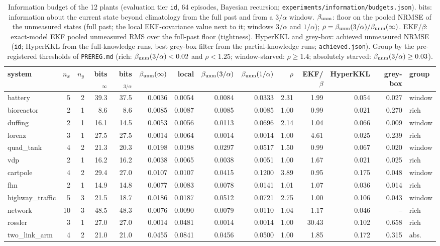 \begin{table}[ht]\centering\scriptsize
\caption{Information budget of the 12 plants (evaluation tier \texttt{id}, 64 episodes, Bayesian recursion;
\texttt{experiments/information/budgets.json}). bits: information about the current state beyond climatology
from the full past and from a $3/\alpha$ window. $\beta_{\rm unm}$: floor on the pooled NRMSE of the
unmeasured states (full past; the local EKF-covariance value next to it; windows $3/\alpha$ and $1/\alpha$);
$\rho=\beta_{\rm unm}(3/\alpha)/\beta_{\rm unm}(\infty)$. EKF/$\beta$: exact-model EKF pooled unmeasured RMS over the
full-past floor (tightness). HyperKKL and grey-box: achieved unmeasured NRMSE (\texttt{id}; HyperKKL from the
full-knowledge runs, best grey-box filter from the partial-knowledge runs; \texttt{achieved.json}). Group by the
pre-registered thresholds of \texttt{PREREG.md} (rich: $\beta_{\rm unm}(3/\alpha)<0.02$ and $\rho<1.25$; window-starved:
$\rho\ge1.4$; absolutely starved: $\beta_{\rm unm}(3/\alpha)\ge0.03$).}\label{tab:m4-budgets}
\setlength{\tabcolsep}{2.2pt}
\begin{tabular}{@{}lrrrrrrrrrrrrl@{}}\hline
system & $n_x$ & $n_y$ & bits$_\infty$ & bits$_{3/\alpha}$ & $\beta_{\rm unm}(\infty)$ & local & $\beta_{\rm unm}(3/\alpha)$ & $\beta_{\rm unm}(1/\alpha)$ & $\rho$ & EKF/$\beta$ & HyperKKL & grey-box & group\\\hline
battery & 5 & 2 & 39.3 & 37.5 & 0.0036 & 0.0054 & 0.0084 & 0.0333 & 2.31 & 1.99 & 0.054 & 0.027 & window \\
bioreactor & 2 & 1 & 8.6 & 8.6 & 0.0085 & 0.0087 & 0.0085 & 0.0085 & 1.00 & 0.99 & 0.021 & 0.270 & rich \\
duffing & 2 & 1 & 16.1 & 14.5 & 0.0053 & 0.0056 & 0.0113 & 0.0696 & 2.14 & 1.04 & 0.066 & 0.009 & window \\
lorenz & 3 & 1 & 27.5 & 27.5 & 0.0014 & 0.0064 & 0.0014 & 0.0014 & 1.00 & 4.61 & 0.025 & 0.239 & rich \\
quad\_tank & 4 & 2 & 21.3 & 20.3 & 0.0198 & 0.0198 & 0.0297 & 0.0517 & 1.50 & 0.99 & 0.067 & 0.020 & window \\
vdp & 2 & 1 & 16.2 & 16.2 & 0.0038 & 0.0065 & 0.0038 & 0.0051 & 1.00 & 1.67 & 0.021 & 0.025 & rich \\
cartpole & 4 & 2 & 29.4 & 27.0 & 0.0107 & 0.0107 & 0.0415 & 0.1200 & 3.89 & 0.95 & 0.175 & 0.048 & window \\
fhn & 2 & 1 & 14.9 & 14.8 & 0.0077 & 0.0083 & 0.0078 & 0.0141 & 1.01 & 1.07 & 0.036 & 0.014 & rich \\
highway\_traffic & 5 & 3 & 21.5 & 18.7 & 0.0186 & 0.0187 & 0.0512 & 0.0721 & 2.75 & 1.00 & 0.106 & 0.043 & window \\
network & 10 & 3 & 48.5 & 48.3 & 0.0076 & 0.0090 & 0.0079 & 0.0110 & 1.04 & 1.17 & 0.046 & -- & rich \\
rossler & 3 & 1 & 27.0 & 27.0 & 0.0014 & 0.0481 & 0.0014 & 0.0014 & 1.00 & 30.43 & 0.102 & 0.658 & rich \\
two\_link\_arm & 4 & 2 & 21.0 & 21.0 & 0.0455 & 0.0841 & 0.0456 & 0.0500 & 1.00 & 1.85 & 0.172 & 0.315 & abs. \\\hline
\end{tabular}
\end{table}

